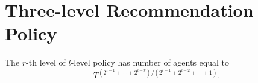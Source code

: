 
\section{Three-level Recommendation Policy}
The $r$-th level of $l$-level policy has number of agents equal to
\[
T^{(2^{l-1}+\cdots+2^{l-r})/(2^{l-1}+2^{l-2}+\cdots + 1)}.
\]